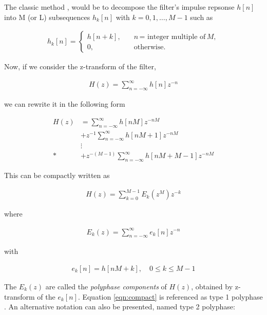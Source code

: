 The classic method \cite{Oppenheim}, \cite{oppenheim2} would be to decompose the filter's impulse repsonse $h[n]$ into M (or L) subsequences $h_k[n]$ with $ k = 0, 1, \dots, M-1$ such as


\begin{align}
h_k[n] = 
	\begin{cases}
	h[n + k], & \quad n \,\text{= integer multiple of} \,M, \\ 
	0, & \quad \text{otherwise}. \label{eqn:subsequences}
	\end{cases}
\end{align}

Now, if we consider the z-transform of the filter,

\begin{align}
	H(z) = \sum\limits_{n=-\infty}^{\infty} h[n]z^{-n} \label{eqn:ztrans}
\end{align}

we can rewrite it in the following form

	\begin{align} \label{eqn:ztranspoly}
		H(z) &= \sum\limits_{n=-\infty}^{\infty} h[nM]z^{-nM} \nonumber\\ 
		&+ z^{-1} \sum\limits_{n=-\infty}^{\infty} h[nM+1]z^{-nM} \\ 
		&\vdots \nonumber \\*
		&+ z^{-(M-1)} \sum\limits_{n=-\infty}^{\infty} h[nM+M-1]z^{-nM} \nonumber 
	\end{align}

This can be compactly written as 

\begin{align}
H(z) = \sum\limits_{k=0}^{M-1} E_k(z^M)z^{-k} \label{eqn:compact}
\end{align}

where

\begin{align}
E_k(z) = \sum\limits_{n=-\infty}^{\infty} e_k[n]z^{-n} \label{eqn:zpolycomp}
\end{align}

with

\begin{align}
e_k[n] = h[nM + k], \quad 0 \leq k \leq M-1 \label{eqn:polycomp}
\end{align}

The $E_k(z)$ are called the \textit{polyphase components} of $H(z)$, obtained by z-transform \cite{Oppenheim} of the $e_k[n]$. Equation \ref{eqn:compact} is referenced as type 1 polyphase \cite{vaidyanathan}. An alternative notation can also be presented, named type 2 polyphase:

